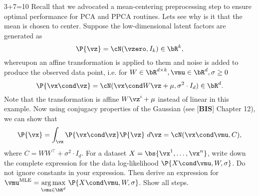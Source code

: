 \documentclass[a4paper,11pt]{article}
\begin{document}
\begin{mlproblem}{3+7=10}
Recall that we advocated a mean-centering preprocessing step to ensure optimal performance for PCA and PPCA routines. Lets see why is it that the mean is chosen to center. Suppose the low-dimensional latent factors are generated as
\[
\P{\vz} = \cN(\vzero,I_k) \in \bR^k,
\]
whereupon an affine transformation is applied to them and noise is added to produce the observed data point, i.e. for $W \in \bR^{d\times k}, \vmu \in \bR^d, \sigma \geq 0$
\[
\P{\vx\cond\vz} = \cN(\vx\cond W\vz+\mu, \sigma^2\cdot I_d) \in \bR^d.
\]
Note that the transformation is affine $W\vz^i+\mu$ instead of linear in this example. Now using conjugacy properties of the Gaussian (see [\textbf{BIS}] Chapter 12), we can show that
\[
\P{\vx} = \int_{\vz}\P{\vx\cond\vz}\P{\vz}\ d\vz = \cN(\vx\cond\vmu,C),
\]
where $C = WW^\top + \sigma^2\cdot I_d$. For a dataset $X = \bs{\vx^1,\ldots,\vx^n}$, write down the complete expression for the data log-likelihood $\P{X\cond\vmu,W,\sigma}$. Do not ignore constants in your expression. Then derive an expression for $\vmu^{\text{MLE}} = \underset{\vmu\in\bR^d}{\arg\max}\ \P{X\cond\vmu,W,\sigma}$. Show all steps. 
\end{mlproblem}
\end{document}
